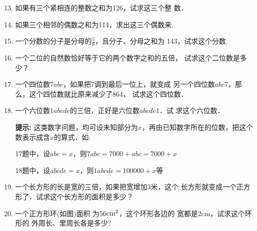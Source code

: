 \begin{enumerate}\setcounter{enumi}{12}
    \item 如果有三个紧相连的整数之和为126，试求这三个整
    数．
    \item 如果三个相邻的偶数之和为114，求出这三个偶数来.
    \item 一个分数的分子是分母的$\frac{5}{8}$，且分子、分母之和为
    143，试求这个分数.
    \item 一个二位的自然数恰好等于它的两个数字之和的五倍，
    试求这个二位数是多少？
    \item 一个四位数$7abc$，如果把7调到最后一位上，就变成
    另一个四位数$abc7$，那么，这个四位数就比原来减少了864，
    试求这个四位数．
    \item 一个六位数$1abcde$的三倍，正好是六位数$abcde1$．试
    求这个六位数．
        
    \textbf{提示:} 这类数字问题，均可设未知部分为$x$，再由已知数字所在的位数，把这个数表示成含$x$的算式．如:

    17题中，设$abc=x$，则$7abc=7000+abc = 7000+x$

    18题中，设$abcde = x$，则$1abcde =100000 + x$等

 \item  一个长方形的长是宽的三倍，如果把宽增加3米，这个
 长方形就变成一个正方形了．试求这个长方形的面积是多少？
    
\item   一个正方形环(如图)面积
为56${\rm cm}^2$，这个环形各边的
宽都是2cm，试求这个环形的
外周长、里周长各是多少?

\begin{center}
\end{center}


\end{enumerate}
